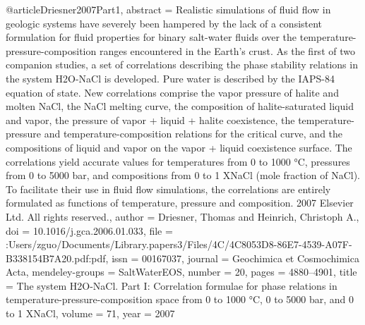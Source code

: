 @article{Driesner2007Part1,
abstract = {Realistic simulations of fluid flow in geologic systems have severely been hampered by the lack of a consistent formulation for fluid properties for binary salt-water fluids over the temperature-pressure-composition ranges encountered in the Earth's crust. As the first of two companion studies, a set of correlations describing the phase stability relations in the system H2O-NaCl is developed. Pure water is described by the IAPS-84 equation of state. New correlations comprise the vapor pressure of halite and molten NaCl, the NaCl melting curve, the composition of halite-saturated liquid and vapor, the pressure of vapor + liquid + halite coexistence, the temperature-pressure and temperature-composition relations for the critical curve, and the compositions of liquid and vapor on the vapor + liquid coexistence surface. The correlations yield accurate values for temperatures from 0 to 1000 °C, pressures from 0 to 5000 bar, and compositions from 0 to 1 XNaCl (mole fraction of NaCl). To facilitate their use in fluid flow simulations, the correlations are entirely formulated as functions of temperature, pressure and composition. {\textcopyright} 2007 Elsevier Ltd. All rights reserved.},
author = {Driesner, Thomas and Heinrich, Christoph A.},
doi = {10.1016/j.gca.2006.01.033},
file = {:Users/zguo/Documents/Library.papers3/Files/4C/4C8053D8-86E7-4539-A07F-B338154B7A20.pdf:pdf},
issn = {00167037},
journal = {Geochimica et Cosmochimica Acta},
mendeley-groups = {SaltWaterEOS},
number = {20},
pages = {4880--4901},
title = {{The system H2O-NaCl. Part I: Correlation formulae for phase relations in temperature-pressure-composition space from 0 to 1000 °C, 0 to 5000 bar, and 0 to 1 XNaCl}},
volume = {71},
year = {2007}
}
